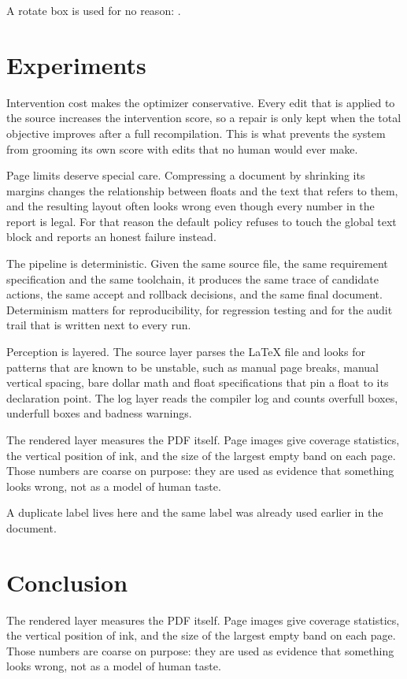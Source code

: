 \documentclass[10pt,a4paper,fleqn]{article}
\begin{document}
A rotate box is used for no reason: .

\clearpage


\section{Experiments}
Intervention cost makes the optimizer conservative. Every edit that is applied to the source increases the intervention score, so a repair is only kept when the total objective improves after a full recompilation. This is what prevents the system from grooming its own score with edits that no human would ever make.

Page limits deserve special care. Compressing a document by shrinking its margins changes the relationship between floats and the text that refers to them, and the resulting layout often looks wrong even though every number in the report is legal. For that reason the default policy refuses to touch the global text block and reports an honest failure instead.

The pipeline is deterministic. Given the same source file, the same requirement specification and the same toolchain, it produces the same trace of candidate actions, the same accept and rollback decisions, and the same final document. Determinism matters for reproducibility, for regression testing and for the audit trail that is written next to every run.

Perception is layered. The source layer parses the LaTeX file and looks for patterns that are known to be unstable, such as manual page breaks, manual vertical spacing, bare dollar math and float specifications that pin a float to its declaration point. The log layer reads the compiler log and counts overfull boxes, underfull boxes and badness warnings.

The rendered layer measures the PDF itself. Page images give coverage statistics, the vertical position of ink, and the size of the largest empty band on each page. Those numbers are coarse on purpose: they are used as evidence that something looks wrong, not as a model of human taste.

A duplicate label lives here \label{sec:dup} and the same label was
already used earlier in the document.

\pagebreak


\section{Conclusion}
The rendered layer measures the PDF itself. Page images give coverage statistics, the vertical position of ink, and the size of the largest empty band on each page. Those numbers are coarse on purpose: they are used as evidence that something looks wrong, not as a model of human taste.
\end{document}
